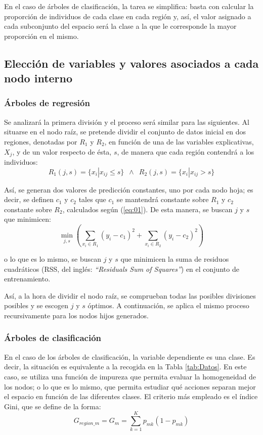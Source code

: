 \documentclass[12pt,twoside]{article}
\begin{document}
En el caso de árboles de clasificación, la tarea se simplifica: basta con calcular la proporción de individuos de cada clase en cada región y, así, el valor asignado a cada subconjunto del espacio será la clase a la que le corresponde la mayor proporción en el mismo.


\subsection{Elección de variables y valores asociados a cada nodo interno} \label{sec: subsec22}
\subsubsection{Árboles de regresión}
Se analizará la primera división y el proceso será similar para las siguientes. Al situarse en el nodo raíz, se pretende dividir el conjunto de datos inicial en dos regiones, denotadas por $R_1$ y $R_2$, en función de una de las variables explicativas, $X_j$, y de un valor respecto de ésta, $s$, de manera que cada región contendrá a los individuos:
\begin{equation*}
R_1 (j,s) = \{ x_i | x_{ij} \leq s \} \, \, \, \wedge \, \, \,  R_2 (j,s) = \{ x_{i} | x_{ij} > s\}
\end{equation*}

Así, se generan dos valores de predicción constantes, uno por cada nodo hoja; es decir, se definen $c_1$ y $c_2$ tales que $c_1$ se mantendrá constante sobre $R_1$ y $c_2$ constante sobre $R_2$, calculados según (\ref{eq:01}). De esta manera, se buscan $j$ y $s$ que minimicen:
\begin{equation*}
\min_{j,s} \left( \sum_{x_i \in R_1}(y_i - c_1)^2 + \sum_{x_i \in R_2}(y_i - c_2)^2 \right)
\end{equation*}

\noindent
o lo que es lo mismo, se buscan $j$ y $s$ que minimicen la suma de residuos cuadráticos (RSS, del inglés: \textit{``Residuals Sum of Squares''}) en el conjunto de entrenamiento.

Así, a la hora de dividir el nodo raíz, se comprueban todas las posibles divisiones posibles y se escogen $j$ y $s$ óptimos. A continuación, se aplica el mismo proceso recursivamente para los nodos hijos generados.


\subsubsection{Árboles de clasificación}
En el caso de los árboles de clasificación, la variable dependiente es una clase. Es decir, la situación es equivalente a la recogida en la Tabla \ref{tab:Datos}. En este caso, se utiliza una función de impureza que permita evaluar la homogeneidad de los nodos; o lo que es lo mismo, que permita estudiar qué acciones separan mejor el espacio en función de las diferentes clases. El criterio más empleado es el índice Gini, que se define de la forma:
\begin{equation*}
G_{region\_m} = G_m = \sum_{k=1}^K p_{mk}(1 - p_{mk})
\end{equation*}
\end{document}
